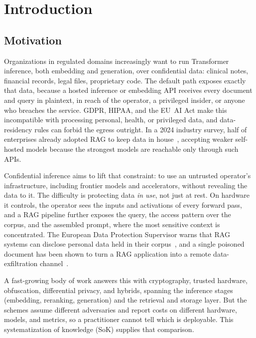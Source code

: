 \section{Introduction}
\label{sec:intro}

\subsection{Motivation}
Organizations in regulated domains increasingly want to run Transformer inference, both
embedding and generation, over confidential data: clinical notes, financial records, legal
files, proprietary code. The default path exposes exactly that data, because a hosted
inference or embedding API receives every document and query in plaintext, in reach of the
operator, a privileged insider, or anyone who breaches the service. GDPR, HIPAA, and the EU~AI
Act make this incompatible with processing personal, health, or privileged data, and
data-residency rules can forbid the egress outright. In a 2024 industry survey, half of
enterprises already adopted RAG to keep data in house~\citep{cloudera_ai_survey}, accepting
weaker self-hosted models because the strongest models are reachable only through such APIs.

Confidential inference aims to lift that constraint: to use an untrusted operator's
infrastructure, including frontier models and accelerators, without revealing the data to it.
The difficulty is protecting data \emph{in use}, not just at rest. On hardware it controls, the
operator sees the inputs and activations of every forward pass, and a RAG pipeline further
exposes the query, the access pattern over the corpus, and the assembled prompt, where the most
sensitive context is concentrated. The European Data Protection
Supervisor warns that RAG systems can disclose personal data held in their
corpus~\citep{edps_rag}, and a single poisoned document has been shown to turn a RAG
application into a remote data-exfiltration channel~\citep{greshake_ipi}.

A fast-growing body of work answers this with cryptography, trusted hardware, obfuscation,
differential privacy, and hybrids, spanning the inference stages (embedding, reranking,
generation) and the retrieval and storage layer. But the schemes assume different adversaries
and report costs on different hardware, models, and metrics, so a practitioner cannot tell
which is deployable. This systematization of knowledge (SoK) supplies that comparison.

